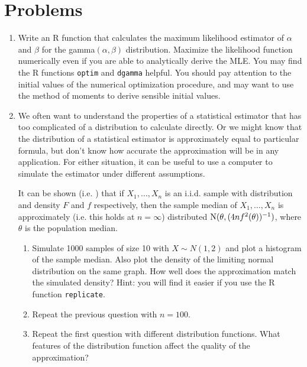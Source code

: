 

\section{Problems}

\begin{enumerate}

\item Write an R function that calculates the maximum likelihood
  estimator of $\alpha$ and $\beta$ for the gamma$(\alpha,\beta)$
  distribution. Maximize the likelihood function numerically even if
  you are able to analytically derive the MLE.  You may find the R
  functions \texttt{optim} and \texttt{dgamma} helpful.  You should
  pay attention to the initial values of the numerical optimization
  procedure, and may want to use the method of moments to derive
  sensible initial values.

\item We often want to understand the properties of a statistical
  estimator that has too complicated of a distribution to calculate
  directly.  Or we might know that the distribution of a statistical
  estimator is approximately equal to particular formula, but don't
  know how accurate the approximation will be in any application.  For
  either situation, it can be useful to use a computer to simulate the
  estimator under different assumptions.

  It can be shown (i.e. \citet[p. 483]{CB02}) that if $X_1,\dots,X_n$
  is an i.i.d. sample with distribution and density $F$ and $f$
  respectively, then the sample median of $X_1,\dots,X_n$ is
  approximately (i.e. this holds at $n = \infty$) distributed $\operatorname{N}(\theta,
  (4 n f^2(\theta))^{-1})$, where $\theta$ is the population median.
  \begin{enumerate}
  \item Simulate 1000 samples of size 10 with $X \sim N(1,2)$ and plot
    a histogram of the sample median.  Also plot the density of the
    limiting normal distribution on the same graph.  How well does the
    approximation match the simulated density?  Hint: you will find it
    easier if you use the R function \texttt{replicate}.
  \item Repeat the previous question with $n=100$.
  \item Repeat the first question with different distribution
    functions.  What features of the distribution function affect the
    quality of the approximation?
  \end{enumerate}


\end{enumerate}
